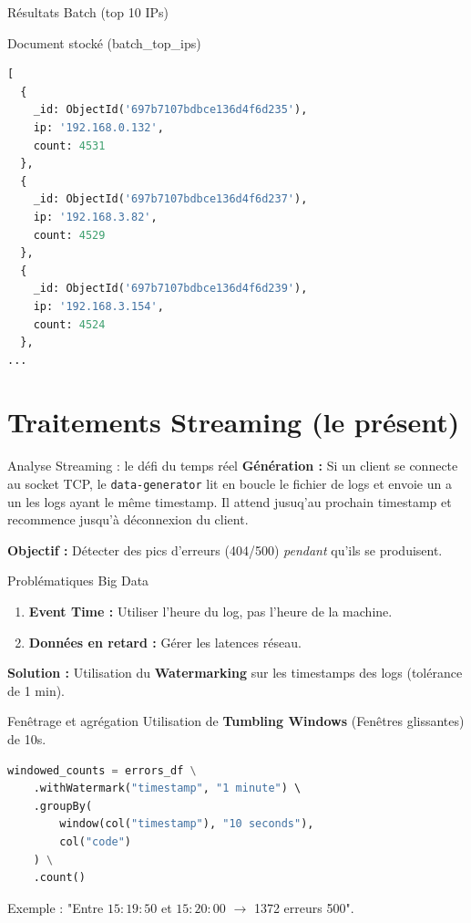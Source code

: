 \documentclass[aspectratio=169]{beamer}
\begin{document}
\begin{frame}[fragile]{Résultats Batch (top 10 IPs)}
    
    \begin{exampleblock}{Document stocké (batch\_top\_ips)}
\begin{lstlisting}[language=Python]
[
  {
    _id: ObjectId('697b7107bdbce136d4f6d235'),
    ip: '192.168.0.132',
    count: 4531
  },
  {
    _id: ObjectId('697b7107bdbce136d4f6d237'),
    ip: '192.168.3.82',
    count: 4529
  },
  {
    _id: ObjectId('697b7107bdbce136d4f6d239'),
    ip: '192.168.3.154',
    count: 4524
  },
...
\end{lstlisting}
    \end{exampleblock}
\end{frame}

\section{Traitements Streaming (le présent)}

\begin{frame}{Analyse Streaming : le défi du temps réel}
    \textbf{Génération :} Si un client se connecte au socket TCP, le \texttt{data-generator} lit en boucle le fichier de logs et envoie un a un les logs ayant le même timestamp. Il attend jusuq'au prochain timestamp et recommence jusqu'à déconnexion du client.
    
    \vspace{0.5cm}
    \textbf{Objectif :} Détecter des pics d'erreurs (404/500) \textit{pendant} qu'ils se produisent.
    
    \begin{block}{Problématiques Big Data}
    \begin{enumerate}
        \item \textbf{Event Time :} Utiliser l'heure du log, pas l'heure de la machine.
        \item \textbf{Données en retard :} Gérer les latences réseau.
    \end{enumerate}
    \end{block}
    
    \textbf{Solution :} Utilisation du \textbf{Watermarking} sur les timestamps des logs (tolérance de 1 min).
\end{frame}

\begin{frame}[fragile]{Fenêtrage et agrégation}
    Utilisation de \textbf{Tumbling Windows} (Fenêtres glissantes) de 10s.
    
\begin{lstlisting}[language=Python]
windowed_counts = errors_df \
    .withWatermark("timestamp", "1 minute") \ 
    .groupBy(
        window(col("timestamp"), "10 seconds"),
        col("code")
    ) \
    .count()
\end{lstlisting}

    Exemple : "Entre $15:19:50$ et $15:20:00$ $\rightarrow$ 1372 erreurs 500".
\end{frame}
\end{document}
